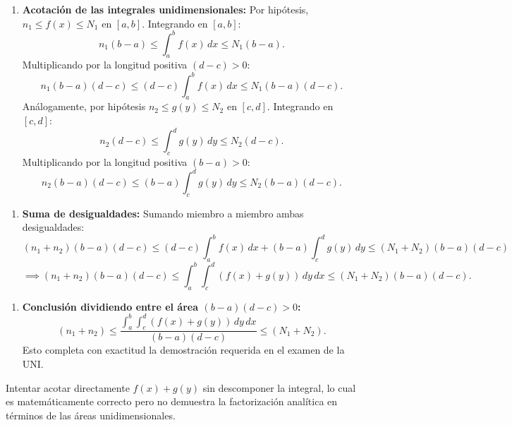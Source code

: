 \documentclass[11pt,a4paper]{article}
\begin{document}
\begin{enumerate}[label=\textbf{\arabic*.}]
\item \textbf{Acotación de las integrales unidimensionales:}
Por hipótesis, $n_1 \le f(x) \le N_1$ en $[a,b]$. Integrando en $[a,b]$:
\begin{equation*}
n_1(b - a) \le \int_a^b f(x) \, dx \le N_1(b - a).
\end{equation*}
Multiplicando por la longitud positiva $(d - c) > 0$:
\begin{equation*}
n_1(b - a)(d - c) \le (d - c)\int_a^b f(x) \, dx \le N_1(b - a)(d - c).
\end{equation*}
Análogamente, por hipótesis $n_2 \le g(y) \le N_2$ en $[c,d]$. Integrando en $[c,d]$:
\begin{equation*}
n_2(d - c) \le \int_c^d g(y) \, dy \le N_2(d - c).
\end{equation*}
Multiplicando por la longitud positiva $(b - a) > 0$:
\begin{equation*}
n_2(b - a)(d - c) \le (b - a)\int_c^d g(y) \, dy \le N_2(b - a)(d - c).
\end{equation*}
\end{enumerate}

\begin{enumerate}[label=\textbf{\arabic*.}]
\item \textbf{Suma de desigualdades:}
Sumando miembro a miembro ambas desigualdades:
\begin{equation*}
(n_1 + n_2)(b - a)(d - c) \le (d - c)\int_a^b f(x) \, dx + (b - a)\int_c^d g(y) \, dy \le (N_1 + N_2)(b - a)(d - c)
\end{equation*}
\begin{equation*}
\implies (n_1 + n_2)(b - a)(d - c) \le \int_a^b \int_c^d (f(x) + g(y)) \, dy \, dx \le (N_1 + N_2)(b - a)(d - c).
\end{equation*}
\end{enumerate}

\begin{enumerate}[label=\textbf{\arabic*.}]
\item \textbf{Conclusión dividiendo entre el área $(b-a)(d-c) > 0$:}
\begin{equation*}
(n_1 + n_2) \le \frac{\int_a^b \int_c^d (f(x) + g(y)) \, dy \, dx}{(b - a)(d - c)} \le (N_1 + N_2).
\end{equation*}
Esto completa con exactitud la demostración requerida en el examen de la UNI.
\end{enumerate}

\begin{trapbox}
Intentar acotar directamente $f(x)+g(y)$ sin descomponer la integral, lo cual es matemáticamente correcto pero no demuestra la factorización analítica en términos de las áreas unidimensionales.
\end{trapbox}
\end{document}

